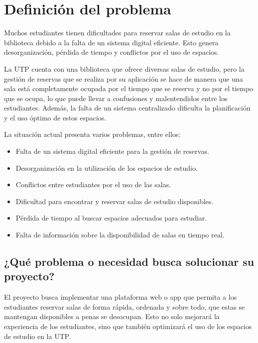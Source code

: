 \documentclass{article}
\begin{document}
\newpage

\section{Definición del problema}

Muchos estudiantes tienen dificultades para reservar salas de estudio en la biblioteca 
debido a la falta de un sistema digital eficiente. Esto genera desorganización, pérdida de tiempo y conflictos por el uso de espacios.

La UTP cuenta con una biblioteca que ofrece diversas salas de estudio, pero la gestión de reservas que se realiza por su aplicación se hace de manera que una sala está completamente ocupada por el tiempo que se reserva y no por el tiempo que se ocupa, lo que puede llevar a confusiones y malentendidos entre los estudiantes. Además, la falta de un sistema centralizado dificulta la planificación y el uso óptimo de estos espacios.

La situación actual presenta varios problemas, entre ellos:
\begin{itemize}
    \item Falta de un sistema digital eficiente para la gestión de reservas.
    \item Desorganización en la utilización de los espacios de estudio.
    \item Conflictos entre estudiantes por el uso de las salas.
    \item Dificultad para encontrar y reservar salas de estudio disponibles.
    \item Pérdida de tiempo al buscar espacios adecuados para estudiar.
    \item Falta de información sobre la disponibilidad de salas en tiempo real.
\end{itemize}

\subsection{¿Qué problema o necesidad busca solucionar su proyecto?}

El proyecto busca implementar una plataforma web o app que permita a los estudiantes 
reservar salas de forma rápida, ordenada y sobre todo, que estas se mantengan disponibles a penas se desocupan. Esto no solo mejorará la experiencia de los estudiantes, sino que también optimizará el uso de los espacios de estudio en la UTP.

\newpage
\end{document}
